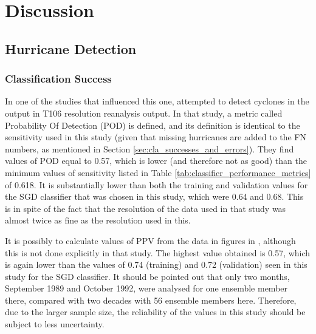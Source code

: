\documentclass[pdftex,12pt,a4paper]{report}
\newcommand{\ts}{\textsuperscript}
\begin{document}

\chapter{Discussion}
\label{chap:discussion}

\section{Hurricane Detection}

\subsection{Classification Success}
\label{sec:classification_success}
In one of the studies that influenced this one, \textcite{walsh1997objective} attempted to detect
cyclones in the output in T106 resolution reanalysis output. In that study, a metric called
Probability Of Detection (POD) is defined, and its definition is identical to the sensitivity used
in this study (given that missing hurricanes are added to the FN numbers, as mentioned in Section
\ref{sec:cla_successes_and_errors}). They find values of POD equal to \SI{0.57}{}, which is
lower (and therefore not as good) than the minimum values of sensitivity listed in Table
\ref{tab:classifier_performance_metrics} of \SI{0.618}{}. It is substantially lower than both the
training and validation values for the SGD classifier that was chosen in this study, which were
\SI{0.64}{} and \SI{0.68}{}. This is in spite of the fact that the resolution of the data used in
that study was almost twice as fine as the resolution used in this.

It is possibly to calculate values of PPV from the data in figures in \textcite{walsh1997objective},
although this is not done explicitly in that study. The highest value obtained is \SI{0.57}{}, which
is again lower than the values of \SI{0.74}{} (training) and \SI{0.72}{} (validation) seen in this
study for the SGD classifier. It should be pointed out that only two months, September 1989 and
October 1992, were analysed for one ensemble member there, compared with two decades with 56
ensemble members here. Therefore, due to the larger sample size, the reliability of the values in
this study should be subject to less uncertainty.
\end{document}
